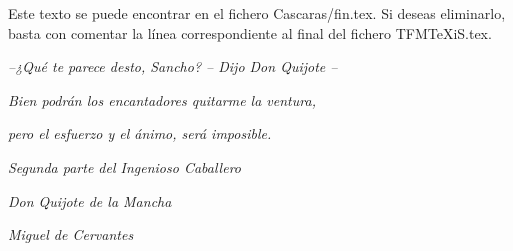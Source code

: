 %
%
%
%
%
%
%
%
%
%
%
%


\ifpdf
\fi

\thispagestyle{empty}\mbox{}

Este texto se puede encontrar en el fichero Cascaras/fin.tex. Si deseas eliminarlo, basta con comentar la línea correspondiente al final del fichero TFMTeXiS.tex.

\vspace*{4cm}

\small

\hfill \emph{--¿Qué te parece desto, Sancho? -- Dijo Don Quijote --}

\hfill \emph{Bien podrán los encantadores quitarme la ventura,}

\hfill \emph{pero el esfuerzo y el ánimo, será imposible.}

\hfill 

\hfill \emph{Segunda parte del Ingenioso Caballero} 

\hfill \emph{Don Quijote de la Mancha}

\hfill \emph{Miguel de Cervantes}

